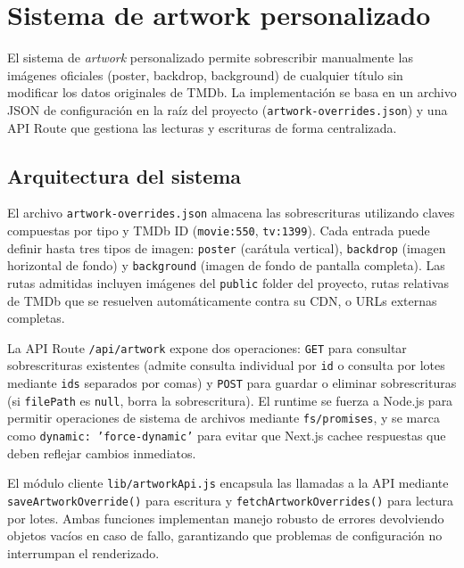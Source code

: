 \section{Sistema de artwork personalizado}

El sistema de \textit{artwork} personalizado permite sobrescribir manualmente las imágenes oficiales (poster, backdrop, background) de cualquier título sin modificar los datos originales de TMDb. La implementación se basa en un archivo JSON de configuración en la raíz del proyecto (\texttt{artwork-overrides.json}) y una API Route que gestiona las lecturas y escrituras de forma centralizada.

\subsection{Arquitectura del sistema}

El archivo \texttt{artwork-overrides.json} almacena las sobrescrituras utilizando claves compuestas por tipo y TMDb ID (\texttt{movie:550}, \texttt{tv:1399}). Cada entrada puede definir hasta tres tipos de imagen: \texttt{poster} (carátula vertical), \texttt{backdrop} (imagen horizontal de fondo) y \texttt{background} (imagen de fondo de pantalla completa). Las rutas admitidas incluyen imágenes del \texttt{public} folder del proyecto, rutas relativas de TMDb que se resuelven automáticamente contra su CDN, o URLs externas completas.

La API Route \texttt{/api/artwork} expone dos operaciones: \texttt{GET} para consultar sobrescrituras existentes (admite consulta individual por \texttt{id} o consulta por lotes mediante \texttt{ids} separados por comas) y \texttt{POST} para guardar o eliminar sobrescrituras (si \texttt{filePath} es \texttt{null}, borra la sobrescritura). El runtime se fuerza a Node.js para permitir operaciones de sistema de archivos mediante \texttt{fs/promises}, y se marca como \texttt{dynamic: 'force-dynamic'} para evitar que Next.js cachee respuestas que deben reflejar cambios inmediatos.

El módulo cliente \texttt{lib/artworkApi.js} encapsula las llamadas a la API mediante \texttt{saveArtworkOverride()} para escritura y \texttt{fetchArtworkOverrides()} para lectura por lotes. Ambas funciones implementan manejo robusto de errores devolviendo objetos vacíos en caso de fallo, garantizando que problemas de configuración no interrumpan el renderizado.

